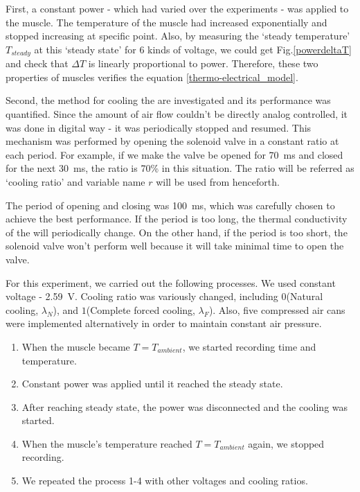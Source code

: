 First, a constant power - which had varied over the experiments - was applied to the muscle.
The temperature of the muscle had increased exponentially and stopped increasing at specific point.
Also, by measuring the `steady temperature' $ T_{steady} $ at this `steady state' for 6 kinds of voltage, 
we could get Fig.\ref{powerdeltaT} and check that $ \Delta T $ is linearly proportional to power.
Therefore, these two properties of muscles verifies the equation \eqref{thermo-electrical_model}.

Second, the method for cooling the \scps are investigated and its performance was quantified. %
Since the amount of air flow couldn't be directly analog controlled,
it was done in digital way - it was periodically stopped and resumed.
This mechanism was performed by opening the solenoid valve in a constant ratio at each period. For example, if we make the valve be opened for \SI{70}{\milli\second} and closed for the next \SI{30}{\milli\second}, the ratio is 70\% in this situation. 
The ratio will be referred as `cooling ratio' and variable name $r$ will be used from henceforth.

The period of opening and closing was \SI{100}{\milli\second}, which was carefully chosen to achieve the best performance. If the period is too long, the thermal conductivity of the \scps will periodically change. On the other hand, if the period is too short, the solenoid valve won't perform well because it will take minimal time to open the valve. 

For this experiment, we carried out the following processes. We used constant voltage - \SI{2.59}{\volt}. Cooling ratio was variously changed, including $0$(Natural cooling, $\lambda_{N}$), and $1$(Complete forced cooling, $\lambda_{F}$). Also, five compressed air cans were implemented alternatively in order to maintain constant air pressure. 
\begin{enumerate}
	\item When the muscle became $T=T_{ambient}$, we started recording time and temperature.
	\item Constant power was applied until it reached the steady state.
	\item After reaching steady state, the power was disconnected and the cooling was started. 
	\item When the muscle's temperature reached $T=T_{ambient}$ again, we stopped recording. 
	\item We repeated the process 1-4 with other voltages and cooling ratios.
\end{enumerate}


